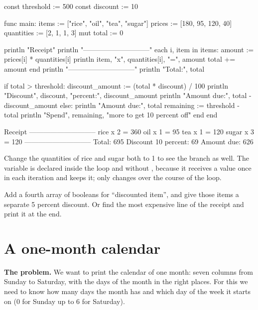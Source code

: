 \begin{salamcode}
const threshold := 500
const discount := 10

func main:
    items := ["rice", "oil", "tea", "sugar"]
    prices := [180, 95, 120, 40]
    quantities := [2, 1, 1, 3]
    mut total := 0

    println "Receipt"
    println "-----------------------------"
    each i, item in items:
        amount := prices[i] * quantities[i]
        println item, "x", quantities[i], "=", amount
        total += amount
    end
    println "-----------------------------"
    println "Total:", total

    if total > threshold:
        discount_amount := (total * discount) / 100
        println "Discount", discount, "percent:", discount_amount
        println "Amount due:", total - discount_amount
    else:
        println "Amount due:", total
        remaining := threshold - total
        println "Spend", remaining, "more to get 10 percent off"
    end
end
\end{salamcode}

\begin{salamout}
Receipt
-----------------------------
rice x 2 = 360
oil x 1 = 95
tea x 1 = 120
sugar x 3 = 120
-----------------------------
Total: 695
Discount 10 percent: 69
Amount due: 626
\end{salamout}

Change the quantities of rice and sugar both to 1 to see the 
branch as well. The variable  is declared inside the loop and
without , because it receives a value once in each iteration and
keeps it; only  changes over the course of the loop.

\begin{tip}
Add a fourth array of booleans for ``discounted item'', and give those
items a separate 5 percent discount. Or find the most expensive line of the
receipt and print it at the end.
\end{tip}

\section{A one-month calendar}

\textbf{The problem.} We want to print the calendar of one month: seven
columns from Sunday to Saturday, with the days of the month in the right
places. For this we need to know how many days the month has and which day
of the week it starts on (0 for Sunday up to 6 for Saturday).

